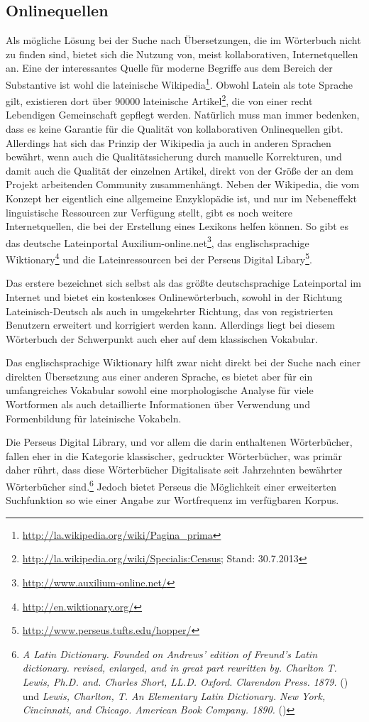 \documentclass[fontsize=12pt,abstract=on,titlepage,bibliography=totoc,ngerman,listof=totoc]{scrreprt}
\begin{document}
\subsection{Onlinequellen}
\label{subsec:online}
Als mögliche Lösung bei der Suche nach Übersetzungen, die im Wörterbuch nicht zu finden sind, bietet sich die Nutzung von, meist  kollaborativen, Internetquellen an. Eine der interessantes Quelle für moderne Begriffe aus dem Bereich der Substantive ist wohl die lateinische Wikipedia\footnote{\url{http://la.wikipedia.org/wiki/Pagina\_prima}}. Obwohl Latein als tote Sprache gilt, existieren dort über 90000 lateinische Artikel\footnote{\url{http://la.wikipedia.org/wiki/Specialis:Census}; Stand: 30.7.2013}, die von einer recht Lebendigen Gemeinschaft gepflegt werden. Natürlich muss man immer bedenken, dass es keine Garantie für die Qualität von kollaborativen Onlinequellen gibt. Allerdings hat sich das Prinzip der Wikipedia ja auch in anderen Sprachen bewährt, wenn auch die Qualitätssicherung durch manuelle Korrekturen, und damit auch die Qualität der einzelnen Artikel, direkt von der Größe der an dem Projekt arbeitenden Community zusammenhängt. Neben der Wikipedia, die vom Konzept her eigentlich eine allgemeine Enzyklopädie ist, und nur im Nebeneffekt linguistische Ressourcen zur Verfügung stellt, gibt es noch weitere Internetquellen, die bei der Erstellung eines Lexikons helfen können. So gibt es das deutsche Lateinportal Auxilium-online.net\footnote{\url{http://www.auxilium-online.net/}}, das englischsprachige Wiktionary\footnote{\url{http://en.wiktionary.org/}} und die Lateinressourcen bei der Perseus Digital Libary\footnote{\url{http://www.perseus.tufts.edu/hopper/}}. \par
Das erstere bezeichnet sich selbst als das größte deutschsprachige Lateinportal im Internet und bietet ein kostenloses Onlinewörterbuch, sowohl in der Richtung Lateinisch-Deutsch als auch in umgekehrter Richtung, das von registrierten Benutzern erweitert und korrigiert werden kann. Allerdings liegt bei diesem Wörterbuch der Schwerpunkt auch eher auf dem klassischen Vokabular. \par
Das englischsprachige Wiktionary hilft zwar nicht direkt bei der Suche nach einer direkten Übersetzung aus einer anderen Sprache, es bietet aber für ein umfangreiches Vokabular sowohl eine morphologische Analyse für viele Wortformen als auch detaillierte Informationen über Verwendung und Formenbildung für lateinische Vokabeln. \par
Die Perseus Digital Library, und vor allem die darin enthaltenen Wörterbücher, fallen eher in die Kategorie klassischer, gedruckter Wörterbücher, was primär daher rührt, dass diese Wörterbücher Digitalisate seit Jahrzehnten bewährter Wörterbücher sind.\footnote{\textit{A Latin Dictionary. Founded on Andrews' edition of Freund's Latin dictionary. revised, enlarged, and in great part rewritten by. Charlton T. Lewis, Ph.D. and. Charles Short, LL.D. Oxford. Clarendon Press. 1879.} (\persalatin) und \textit{Lewis, Charlton, T. An Elementary Latin Dictionary. New York, Cincinnati, and Chicago. American Book Company. 1890.} (\perselemlat)} Jedoch bietet Perseus die Möglichkeit einer erweiterten Suchfunktion so wie einer Angabe zur Wortfrequenz im verfügbaren Korpus. \par
\end{document}
